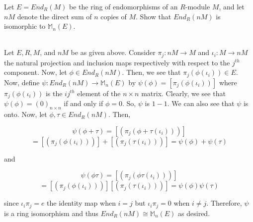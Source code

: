 Let $E = End_R(M)$ be the ring of endomorphisms of an $R$-module $M$, and let $nM$ denote the
direct sum of $n$ copies of $M$. Show that $End_R(nM)$ is isomorphic to $\mathbb{M}_n(E)$.\\

\begin{solution}\renewcommand{\qedsymbol}{}\ \\
    Let $E, R, M$, and $nM$ be as given above. Consider $\pi_j:nM\rightarrow M$ and
    $\iota_i:M\rightarrow nM$ the natural projection and inclusion maps respectively with respect to the
    $j^{th}$ component. Now, let $\phi\in End_R(nM)$. Then, we see that $\pi_j(\phi(\iota_i))\in E$.
    Now, define $\psi:End_R(nM)\rightarrow\mathbb{M}_n(E)$ by $\psi(\phi)=[\pi_j(\phi(\iota_i))]$ where
    $\pi_j(\phi(\iota_i))$ is the $ij^{th}$ element of the $n\times n$ matrix. Clearly, we see that
    $\psi(\phi)=(0)_{n\times n}$ if and only if $\phi=0$. So, $\psi$ is $1-1$. We can also see that
    $\psi$ is onto. Now, let $\phi,\tau\in End_R(nM)$. Then,

    $$\psi(\phi+\tau)=[(\pi_j(\phi+\tau(\iota_i)))]$$
    $$=[(\pi_j(\phi(\iota_i)))]+[(\pi_j(\tau(\iota_i)))]=\psi(\phi)+\psi(\tau)$$

    and

    $$\psi(\phi\tau)=[(\pi_j(\phi\tau(\iota_i)))]$$
    $$=[(\pi_j(\phi(\iota_i)))][(\pi_j(\tau(\iota_i)))]=\psi(\phi)\psi(\tau)$$

    since $\iota_i\pi_j=e$ the identity map when $i=j$ but $\iota_i\pi_j=0$ when $i\neq j$. Therefore,
    $\psi$ is a ring isomorphism and thus $End_R(nM)\cong\mathbb{M}_n(E)$ as desired.

\end{solution}